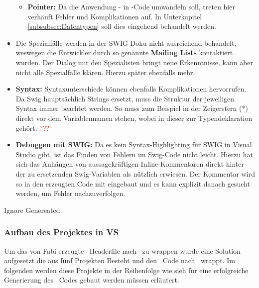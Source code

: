 \begin{itemize}
\begin{itemize}
	\item \textbf{Pointer:} Da die Anwendung \CC - in \CS -Code umwandeln soll, treten hier verhäuft Fehler und Komplikationen auf. In Unterkapitel \ref{subsubsec:Datentypen} soll dies eingehend behandelt werden. 
	\end{itemize}
\item Die Spezialfälle werden in der SWIG-Doku nicht ausreichend behandelt, weswegen die Entwickler durch so genannte \textbf{Mailing Lists} kontaktiert wurden. Der Dialog mit den Spezialisten bringt neue Erkenntnisse, kann aber nicht alle Spezialfälle klären. Hierzu später ebenfalls mehr.
\item \textbf{Syntax:} Syntaxunterschiede können ebenfalls Komplikationen hervorrufen. Da Swig hauptsächlich Strings ersetzt, muss die Struktur der jeweiligen Syntax immer beachtet werden. So muss zum Beispiel in \CC der Zeigerstern (*) direkt vor dem Variablennamen stehen, wobei in \CS dieser zur Typendeklaration gehört. \textcolor{red}{???}
\item \textbf{Debuggen mit SWIG:} Da es kein Syntax-Highlighting für SWIG in Visual Studio gibt, ist das Finden von Fehlern im Swig-Code nicht leicht. Hierzu hat sich das Anhängen von aussagekräftigen Inline-Kommentaren direkt hinter der zu ersetzenden Swig-Variablen als nützlich erwiesen. Der Kommentar wird so in den erzeugten Code mit eingebaut und es kann explizit danach gesucht werden, um Fehler nachzuverfolgen.
\end{itemize}



	
	
		


	Ignore Genereated\\


\subsubsection{Aufbau des Projektes in VS}\label{subsubsec:Aufbau}

Um das von Fabi erzeugte \CC~Headerfile nach \CS~zu wrappen wurde eine Solution aufgesetzt die aus fünf Projekten Besteht und den \CC~Code nach \CS~wrappt. Im folgenden werden diese Projekte in der Reihenfolge wie sieh für eine erfolgreiche Generierung des \CS~Codes gebaut werden müssen erläutert.\\


